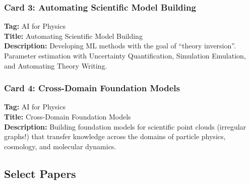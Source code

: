 \documentclass[11pt]{article}
\begin{document}
\subsubsection{Card 3: Automating Scientific Model Building}
\label{sec:research-card3}
\textbf{Tag:} AI for Physics\\
\textbf{Title:} Automating Scientific Model Building\\
\textbf{Description:} Developing ML methods with the goal of ``theory inversion''. Parameter estimation with Uncertainty Quantification, Simulation Emulation, and Automating Theory Writing.

\subsubsection{Card 4: Cross-Domain Foundation Models}
\label{sec:research-card4}
\textbf{Tag:} AI for Physics\\
\textbf{Title:} Cross-Domain Foundation Models\\
\textbf{Description:} Building foundation models for scientific point clouds (irregular graphs!) that transfer knowledge across the domains of particle physics, cosmology, and molecular dynamics.

\subsection{Select Papers}
\label{sec:research-papers}
\end{document}
